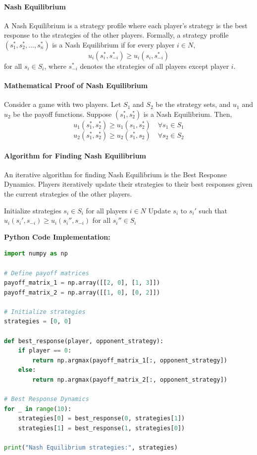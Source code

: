 \documentclass[12pt]{book} %
\begin{document}
\paragraph{Nash Equilibrium}
A Nash Equilibrium is a strategy profile where each player's strategy is the best response to the strategies of the other players. Formally, a strategy profile \( (s_1^*, s_2^*, \ldots, s_n^*) \) is a Nash Equilibrium if for every player \( i \in N \),
\[
u_i(s_i^*, s_{-i}^*) \geq u_i(s_i, s_{-i}^*)
\]
for all \( s_i \in S_i \), where \( s_{-i}^* \) denotes the strategies of all players except player \( i \).

\paragraph{Mathematical Proof of Nash Equilibrium}
Consider a game with two players. Let \( S_1 \) and \( S_2 \) be the strategy sets, and \( u_1 \) and \( u_2 \) be the payoff functions. Suppose \( (s_1^*, s_2^*) \) is a Nash Equilibrium. Then,
\[
u_1(s_1^*, s_2^*) \geq u_1(s_1, s_2^*) \quad \forall s_1 \in S_1
\]
\[
u_2(s_1^*, s_2^*) \geq u_2(s_1^*, s_2) \quad \forall s_2 \in S_2
\]

\paragraph{Algorithm for Finding Nash Equilibrium}
An iterative algorithm for finding Nash Equilibrium is the Best Response Dynamics. Players iteratively update their strategies to their best responses given the current strategies of the other players.
\FloatBarrier
\begin{algorithm}
\caption{Best Response Dynamics}
\begin{algorithmic}[1]
\State Initialize strategies \( s_i \in S_i \) for all players \( i \in N \)
\Repeat
        \State Update \( s_i \) to \( s_i' \) such that \( u_i(s_i', s_{-i}) \geq u_i(s_i'', s_{-i}) \) for all \( s_i'' \in S_i \)
    \EndFor
{}
\end{algorithmic}
\end{algorithm}
\FloatBarrier
\textbf{Python Code Implementation:}
\FloatBarrier
\begin{lstlisting}[language=Python, caption=Best Response Dynamics in Python]
import numpy as np

# Define payoff matrices
payoff_matrix_1 = np.array([[2, 0], [1, 3]])
payoff_matrix_2 = np.array([[1, 0], [0, 2]])

# Initialize strategies
strategies = [0, 0]

def best_response(player, opponent_strategy):
    if player == 0:
        return np.argmax(payoff_matrix_1[:, opponent_strategy])
    else:
        return np.argmax(payoff_matrix_2[:, opponent_strategy])

# Best Response Dynamics
for _ in range(10):
    strategies[0] = best_response(0, strategies[1])
    strategies[1] = best_response(1, strategies[0])

print("Nash Equilibrium strategies:", strategies)
\end{lstlisting}
\FloatBarrier
\end{document}
